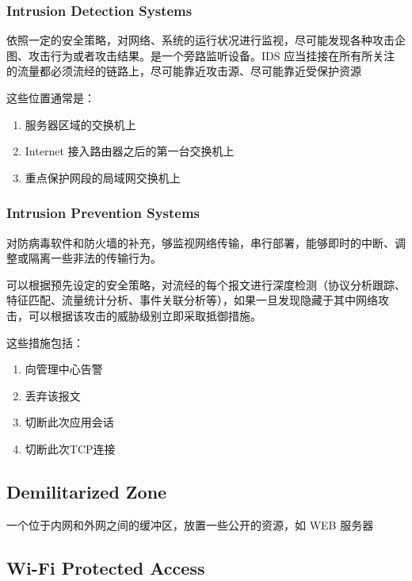\documentclass[11pt,journal,compsoc]{IEEEtran}
\begin{document}
\subsubsection{Intrusion Detection Systems}

依照一定的安全策略，对网络、系统的运行状况进行监视，尽可能发现各种攻击企图、攻击行为或者攻击结果。是一个旁路监听设备。IDS 应当挂接在所有所关注的流量都必须流经的链路上，尽可能靠近攻击源、尽可能靠近受保护资源

这些位置通常是：

\begin{enumerate}
    \item 服务器区域的交换机上
    \item Internet 接入路由器之后的第一台交换机上
    \item 重点保护网段的局域网交换机上
\end{enumerate}


\subsubsection{Intrusion Prevention Systems}

对防病毒软件和防火墙的补充，够监视网络传输，串行部署，能够即时的中断、调整或隔离一些非法的传输行为。

可以根据预先设定的安全策略，对流经的每个报文进行深度检测（协议分析跟踪、特征匹配、流量统计分析、事件关联分析等），如果一旦发现隐藏于其中网络攻击，可以根据该攻击的威胁级别立即采取抵御措施。

这些措施包括：

\begin{enumerate}
    \item 向管理中心告警
    \item 丢弃该报文
    \item 切断此次应用会话
    \item 切断此次TCP连接
\end{enumerate}


\subsection{Demilitarized Zone}

一个位于内网和外网之间的缓冲区，放置一些公开的资源，如 WEB 服务器


\subsection{Wi-Fi Protected Access}
\end{document}

